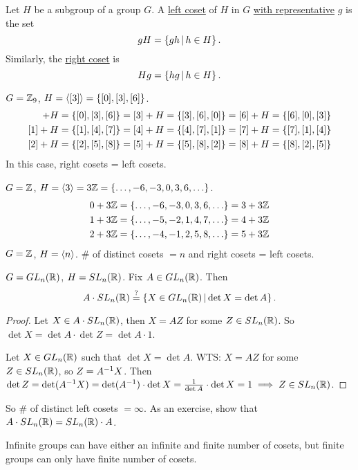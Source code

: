 \documentclass[]{article}
\begin{document}
\begin{definition}
	Let $H$ be a subgroup of a group $G$.
	A \ul{left coset} of $H$ in $G$ \ul{with representative} $g$ is the set $$gH = \left\{ gh \, \middle| \, h\in H \right\}.$$
	Similarly, the \ul{right coset} is $$Hg = \left\{ hg \, \middle| \, h\in H \right\}.$$
\end{definition}
\begin{example}
	$G = \mathbb{Z}_9$, $H =\langle [3] \rangle = \left\{ [0],[3],[6] \right\}$.
	\begin{align*}
		[0] + H &= \set{[0],[3],[6]} = [3] + H = \set{[3],[6],[0]} = [6] + H = \set{[6],[0],[3]} \\
		[1] + H &= \set{[1],[4],[7]} = [4] + H = \set{[4],[7],[1]} = [7] + H = \set{[7],[1],[4]} \\
		[2] + H &= \set{[2],[5],[8]} = [5] + H = \set{[5],[8],[2]} = [8] + H = \set{[8],[2],[5]}
	\end{align*}
	In this case, right cosets = left cosets.
\end{example}
\begin{example}
	$G = \mathbb{Z}$, $H =\gen 3 = 3\mb Z = \set{\dots,-6,-3,0,3,6,\dots}$.
	\begin{align*}
		0 + 3\mb Z &= \set{\dots,-6,-3,0,3,6,\dots} = 3+3\mb Z \\
		1 + 3\mb Z &= \set{\dots,-5,-2,1,4,7,\dots} = 4+3\mb Z \\
		2 + 3\mb Z &= \set{\dots,-4,-1,2,5,8,\dots} = 5+3\mb Z
	\end{align*}
	$G = \mathbb{Z}$, $H =\langle n \rangle$. \# of distinct cosets $=n$ and right cosets = left cosets.
\end{example}
\begin{example}
	$G = GL_n(\mathbb{R})$, $H = SL_n(\mathbb{R})$. Fix $A\in GL_n(\mathbb{R})$.
	Then $$A\cdot SL_n(\mathbb{R}) \overset{?}{=} \left\{ X\in GL_n(\mathbb{R}) \, \middle| \, \det X = \det A \right\}.$$
	\begin{proof}
		\say{$\subseteq$} Let $X\in A\cdot SL_n(\mathbb{R})$, then $X = AZ$ for some $Z\in SL_n(\mathbb{R})$. So $\det X = \det A \cdot \det Z = \det A\cdot 1$.
		
		\say{$\supseteq$} Let $X\in GL_n(\mathbb{R})$ such that $\det X = \det A$.
		WTS: $X = AZ$ for some $Z\in SL_n(\mathbb{R})$, so $Z = A^{-1} X$.
		Then $\det Z = \det(A^{-1} X) = \det(A^{-1})\cdot \det X = \frac{1}{\det A}\cdot \det X = 1 \implies Z\in SL_n(\mathbb{R})$.
	\end{proof}
	So \# of distinct left cosets $=\infty$. As an exercise, show that $A\cdot SL_n(\mathbb{R}) = SL_n(\mathbb{R}) \cdot A$.
\end{example}
\begin{remark}
	Infinite groups can have either an infinite and finite number of cosets, but finite groups can only have finite number of cosets.
\end{remark}
\end{document}
